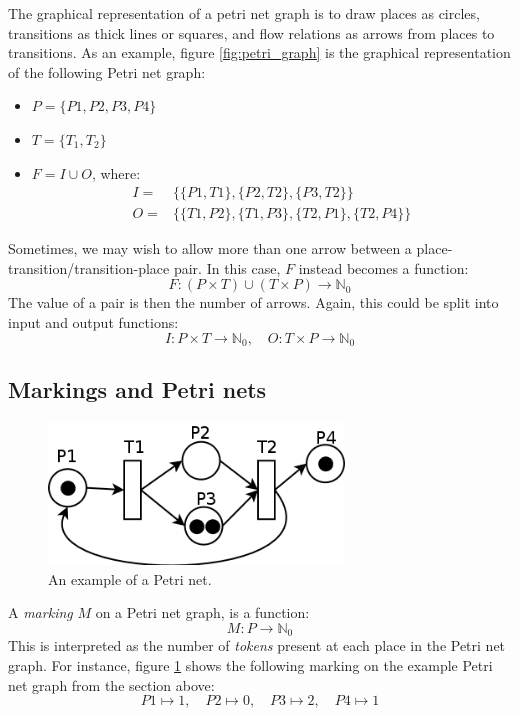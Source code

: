 \documentclass[12pt, a4paper]{article}
\numberwithin{equation}{section}
\begin{document}
The graphical representation of a petri net graph is to draw places as circles, transitions as thick lines or squares, and flow relations as arrows from places to transitions. As an example, figure \ref{fig:petri_graph} is the graphical representation of the following Petri net graph:
\begin{itemize}
\item $P=\{P1, P2, P3, P4\}$
\item $T=\{T_1, T_2\}$
\item $F=I\cup O$, where:
\begin{align}
I=&\{\{P1, T1\}, \{P2, T2\}, \{P3, T2\}\}\\
O=&\{\{T1, P2\}, \{T1, P3\}, \{T2, P1\}, \{T2, P4\}\}
\end{align}
\end{itemize}

Sometimes, we may wish to allow more than one arrow between a place-transition/transition-place pair. In this case, $F$ instead becomes a function:
\begin{equation}
F: (P\times T)\cup(T\times P)\rightarrow\mathbb{N}_0
\end{equation}
The value of a pair is then the number of arrows. Again, this could be split into input and output functions:
\begin{equation}
I: P\times T\rightarrow\mathbb{N}_0,\quad
O: T\times P\rightarrow\mathbb{N}_0
\end{equation}

\subsection{Markings and Petri nets}

\begin{figure}
\centering
\includegraphics[width=0.7\textwidth]{petri_marking}
\caption{An example of a Petri net.}
\label{fig:petri_marking}
\end{figure}

A \textit{marking} $M$ on a Petri net graph, is a function:
\begin{equation}
M: P\rightarrow\mathbb{N}_0
\end{equation}
This is interpreted as the number of \textit{tokens} present at each place in the Petri net graph. For instance, figure \ref{fig:petri_marking} shows the following marking on the example Petri net graph from the section above:
\begin{equation}
P1\mapsto 1,\quad P2\mapsto 0,\quad P3\mapsto 2,\quad P4\mapsto 1
\end{equation}
\end{document}
